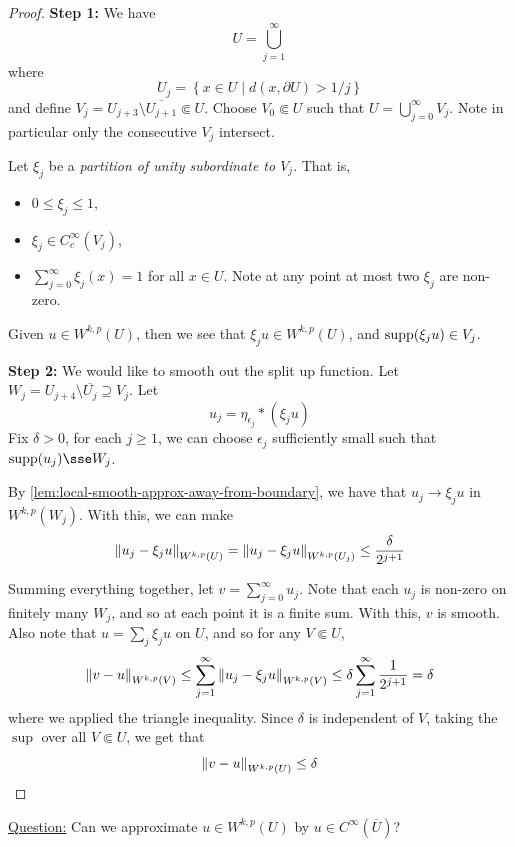 \documentclass{article}
\begin{document}
\begin{proof}
    \textbf{Step 1:} We have
    \[U = \bigcup_{j=1}^\infty\]
    where
    \[U_j = \left\{x \in U \mid d(x, \partial U) > 1/j\right\}\]
    and define \(V_j = U_{j+3} \setminus \overline{U_{j+1}} \Subset U\). Choose \(V_0 \Subset U\) such that \(U = \bigcup_{j=0}^\infty V_j\). Note in particular only the consecutive \(V_j\) intersect.

    Let \(\xi_j\) be a \emph{partition of unity subordinate to \(V_j\)}. That is,
    \begin{itemize}
        \item \(0 \le \xi_j \le 1\),
        \item \(\xi_j \in C_c^\infty(V_j)\),
        \item \(\sum_{j=0}^\infty \xi_j(x) = 1\) for all \(x \in U\). Note at any point at most two \(\xi_j\) are non-zero.
    \end{itemize}

    Given \(u \in W^{k, p}(U)\), then we see that \(\xi_j u \in W^{k, p}(U)\), and \(\operatorname{supp}(\xi_j u)\in V_j\).

    \textbf{Step 2:} We would like to smooth out the split up function. Let \(W_j = U_{j+4} \setminus \overline{U_j} \supseteq V_j\). Let
    \[u_j = \eta_{\epsilon_j} * (\xi_ju)\]
    Fix \(\delta > 0\), for each \(j \ge 1\), we can choose \(\epsilon_j\) sufficiently small such that \(\Supp(u_j) \sse W_j\).

    By \cref{lem:local-smooth-approx-away-from-boundary}, we have that \(u_j \to \xi_j u\) in \(W^{k, p}(W_j)\). With this, we can make
    \[\norm{u_j -  \xi_j u}_{W^{k, p}(U)} = \norm{u_j - \xi_j u}_{W^{k, p}(U_j)} \le \frac{\delta}{2^{j+1}}\]

    Summing everything together, let \(v = \sum_{j=0}^\infty u_j\). Note that each \(u_j\) is non-zero on finitely many \(W_j\), and so at each point it is a finite sum. With this, \(v\) is smooth. Also note that \(u = \sum_j \xi_j u\) on \(U\), and so for any \(V \Subset U\),
    \[\norm{v - u}_{W^{k,p}(V)} \le \sum_{j=1}^\infty \norm{u_j - \xi_j u}_{W^{k, p}(V)} \le \delta \sum_{j=1}^\infty \frac{1}{2^{j+1}} = \delta\]
    where we applied the triangle inequality. Since \(\delta\) is independent of \(V\),  taking the \(\sup\) over all \(V \Subset U\), we get that
    \[\norm{v - u}_{W^{k, p}(U)} \le \delta\]
\end{proof}

\underline{Question:} Can we approximate \(u \in W^{k, p}(U)\) by \(u \in C^\infty(\overline U)\)?
\end{document}
